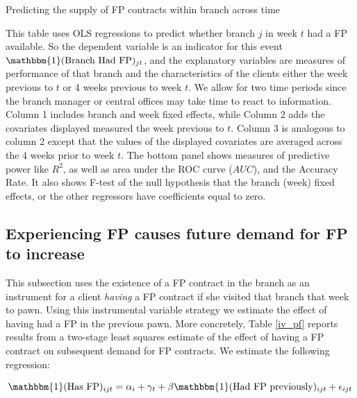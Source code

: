 \documentclass[oneside,11pt]{article}
\begin{document}
\begin{table}[H]
\caption{Predicting the supply of FP contracts within branch across time}
\label{instrument_random}
\begin{center}
\footnotesize{}
\end{center}
 \scriptsize
This table uses OLS regressions to predict whether branch $j$ in week $t$ had a FP available. So the dependent variable is an indicator for this event $\mathbbm{1}(\text{Branch Had FP})_{jt}$, and the explanatory variables are measures of performance of that branch and the characteristics of the clients either the week previous to $t$ or 4 weeks previous to week $t$. We allow for two time periods since the branch manager or central offices may take time to react to information. Column 1 includes branch and week fixed effects, while Column 2 adds the covariates displayed measured the week previous to $t$. Column 3 is analogous to column 2 except that the values of the displayed covariates are averaged across the 4 weeks prior to week $t$. The bottom panel shows measures of predictive power like $R^2$, as well as area under the ROC curve ($AUC$), and the Accuracy Rate. It also shows F-test of the null hypothesis that the branch (week) fixed effects, or the other regressors have coefficients equal to zero. 
\end{table}

\vspace{.1in}


\subsection{Experiencing FP causes future demand for FP to increase}

This subsection uses the existence of a FP contract in the branch as an instrument for a client \textit{having} a FP contract if she visited that branch that week to pawn. Using this instrumental variable strategy we estimate the effect of having had a FP in the previous pawn. More concretely, Table \ref{iv_pf} reports results from a two-stage least squares estimate of the effect of having a FP contract on subsequent demand for FP contracts. We estimate the following regression:

\begin{equation}
    \mathbbm{1}(\text{Has FP})_{ijt} = \alpha_i + \gamma_t + \beta \mathbbm{1}(\text{Had FP previously})_{ijt}  + \epsilon_{ijt}
    \label{eqn:IV}
\end{equation}
\end{document}
